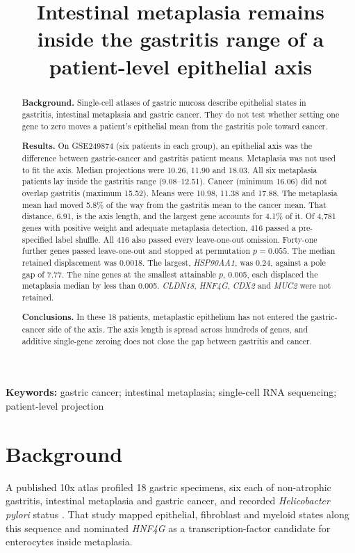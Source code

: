 \documentclass[11pt,a4paper]{article}
\title{Intestinal metaplasia remains inside the gastritis range of a patient-level epithelial axis}
\author{}
\date{}
\begin{document}
\maketitle

\begin{abstract}
\noindent\textbf{Background.}
Single-cell atlases of gastric mucosa describe epithelial states in gastritis, intestinal metaplasia and gastric cancer. They do not test whether setting one gene to zero moves a patient's epithelial mean from the gastritis pole toward cancer.

\noindent\textbf{Results.}
On GSE249874 (six patients in each group), an epithelial axis was the difference between gastric-cancer and gastritis patient means. Metaplasia was not used to fit the axis. Median projections were 10.26, 11.90 and 18.03. All six metaplasia patients lay inside the gastritis range (9.08--12.51). Cancer (minimum 16.06) did not overlap gastritis (maximum 15.52). Means were 10.98, 11.38 and 17.88. The metaplasia mean had moved 5.8\% of the way from the gastritis mean to the cancer mean. That distance, 6.91, is the axis length, and the largest gene accounts for 4.1\% of it. Of 4{,}781 genes with positive weight and adequate metaplasia detection, 416 passed a pre-specified label shuffle. All 416 also passed every leave-one-out omission. Forty-one further genes passed leave-one-out and stopped at permutation \(p=0.055\). The median retained displacement was 0.0018. The largest, \textit{HSP90AA1}, was 0.24, against a pole gap of 7.77. The nine genes at the smallest attainable \(p\), 0.005, each displaced the metaplasia median by less than 0.005. \textit{CLDN18}, \textit{HNF4G}, \textit{CDX2} and \textit{MUC2} were not retained.

\noindent\textbf{Conclusions.}
In these 18 patients, metaplastic epithelium has not entered the gastric-cancer side of the axis. The axis length is spread across hundreds of genes, and additive single-gene zeroing does not close the gap between gastritis and cancer.
\end{abstract}

\noindent\textbf{Keywords:} gastric cancer; intestinal metaplasia; single-cell RNA sequencing; patient-level projection

\section{Background}

A published 10x atlas profiled 18 gastric specimens, six each of non-atrophic gastritis, intestinal metaplasia and gastric cancer, and recorded \textit{Helicobacter pylori} status \cite{li2025}. That study mapped epithelial, fibroblast and myeloid states along this sequence and nominated \textit{HNF4G} as a transcription-factor candidate for enterocytes inside metaplasia.
\end{document}
